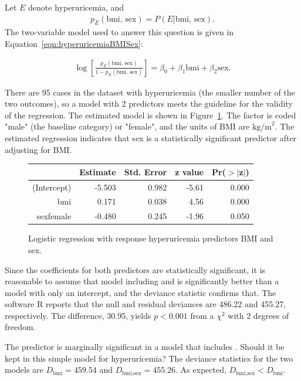 Let $E$ denote hyperuricemia, and
\begin{align*}
p_E(\text{bmi, sex}) = P(E | \text{bmi, sex}).
\end{align*}
The two-variable model used to answer this question is given in Equation~\ref{eqn:hyperuricemiaBMISex}:

\begin{align}
\log\left[\frac{p_E(\text{bmi, sex})}{1 - p_E(\text{bmi, sex})}\right] = \beta_0 +
\beta_1 \text{bmi}  + \beta_2 \text{sex}.
\label{eqn:hyperuricemiaBMISex}
\end{align}

There are 95 cases in the dataset with hyperuricemia (the smaller number of the two outcomes), so a model with 2 predictors meets the guideline for the validity of the regression. The estimated model is shown in Figure~\ref{figure:huBmiSexLogReg}.  The factor  is coded "male" (the baseline category) or "female", and the units of BMI are $\text{kg/m}^2$. The estimated regression indicates that sex is a statistically significant predictor after adjusting for BMI.

\begin{figure}[ht]
\centering
\begin{tabular}{rrrrr}
  \hline
 & Estimate & Std. Error & z value & Pr($>$$|$z$|$) \\
  \hline
(Intercept) & -5.503 & 0.982 & -5.61 & 0.000 \\
  bmi & 0.171 & 0.038 & 4.56 & 0.000 \\
  sexfemale & -0.480 & 0.245 & -1.96 & 0.050 \\
   \hline
\end{tabular}
\caption{Logistic regression with response hyperuricemia
        predictors BMI and sex.}
\label{figure:huBmiSexLogReg}
\end{figure}

Since the coefficients for both predictors are statistically significant, it is reasonable to assume that model including  and  is significantly better than a model with only an intercept, and the deviance statistic confirms that.  The software \textsf{R} reports that the null and residual deviances are 486.22 and 455.27, respectively.  The difference, 30.95, yields $p < 0.001$ from a $\chi^2$ with 2 degrees of freedom.  

The predictor  is marginally significant in a model that includes .  Should it be kept in this simple model for hyperuricemia? The deviance statistics for the two models  are $D_{\text{bmi}} = 459.54$ and $D_{\text{bmi,sex}} = 455.26$.
As expected, $D_{\text{bmi,sex}} < D_{\text{bmi}}$.

